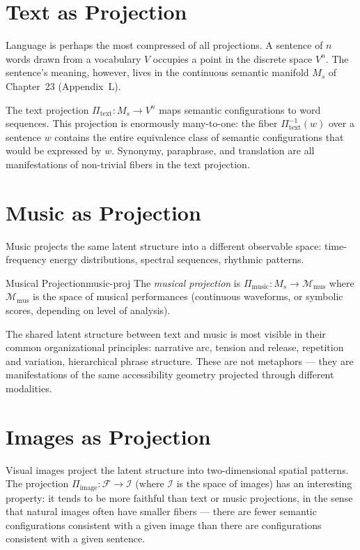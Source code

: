 \section{Text as Projection}

Language is perhaps the most compressed of all projections. A sentence
of $n$ words drawn from a vocabulary $V$ occupies a point in the discrete
space $V^n$. The sentence's meaning, however, lives in the continuous
semantic manifold $M_s$ of Chapter~23 (Appendix~L).

The text projection $\Pi_\text{text} : M_s \to V^n$ maps semantic
configurations to word sequences. This projection is enormously many-to-one:
the fiber $\Pi_\text{text}^{-1}(w)$ over a sentence $w$ contains the
entire equivalence class of semantic configurations that would be expressed
by $w$. Synonymy, paraphrase, and translation are all manifestations of
non-trivial fibers in the text projection.

\section{Music as Projection}

Music projects the same latent structure into a different observable space:
time-frequency energy distributions, spectral sequences, rhythmic patterns.

\begin{definition}{Musical Projection}{music-proj}
  The \emph{musical projection} is $\Pi_\text{music} : M_s \to \mathcal{M}_\text{mus}$
  where $\mathcal{M}_\text{mus}$ is the space of musical performances
  (continuous waveforms, or symbolic scores, depending on level of analysis).
\end{definition}

The shared latent structure between text and music is most visible in
their common organizational principles: narrative arc, tension and release,
repetition and variation, hierarchical phrase structure. These are not
metaphors — they are manifestations of the same accessibility geometry
projected through different modalities.

\section{Images as Projection}

Visual images project the latent structure into two-dimensional spatial
patterns. The projection $\Pi_\text{image} : \mathcal{F} \to \mathcal{I}$
(where $\mathcal{I}$ is the space of images) has an interesting property:
it tends to be more faithful than text or music projections, in the sense
that natural images often have smaller fibers — there are fewer semantic
configurations consistent with a given image than there are configurations
consistent with a given sentence.

